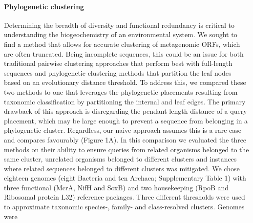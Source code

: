 \documentclass[10pt,letterpaper]{article}
\begin{document}
\paragraph{Phylogenetic clustering}

Determining the breadth of diversity and functional redundancy is critical to understanding the biogeochemistry of an environmental system. We sought to find a method that allows for accurate clustering of metagenomic ORFs, which are often truncated. Being incomplete sequences, this could be an issue for both traditional pairwise clustering approaches that perform best with full-length sequences and phylogenetic clustering methods that partition the leaf nodes based on an evolutionary distance threshold. To address this, we compared these two methods to one that leverages the phylogenetic placements resulting from taxonomic classification by partitioning the internal and leaf edges. The primary drawback of this approach is disregarding the pendant length distance of a query placement, which may be large enough to prevent a sequence from belonging in a phylogenetic cluster. Regardless, our naive approach assumes this is a rare case and compares favourably (Figure 1A). 
In this comparison we evaluated the three methods on their ability to ensure queries from related organisms belonged to the same cluster, unrelated organisms belonged to different clusters and instances where related sequences belonged to different clusters was mitigated.
We chose eighteen genomes (eight Bacteria and ten Archaea; Supplementary Table 1) with three functional (McrA, NifH and SoxB) and two housekeeping (RpoB and Ribosomal protein L32) reference packages. Three different thresholds were used to approximate taxonomic species-, family- and class-resolved clusters. Genomes were 

\end{document}
